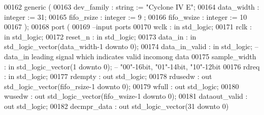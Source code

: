 \begin{DoxyCode}
00162   \textcolor{keywordflow}{generic} (
00163             dev_family      : \textcolor{comment}{string}  := \textcolor{keyword}{"Cyclone IV E"};
00164             data_width      : \textcolor{comment}{integer} := \textcolor{vhdllogic}{}\textcolor{vhdllogic}{31};
00165             fifo_rsize      : \textcolor{comment}{integer} := \textcolor{vhdllogic}{}\textcolor{vhdllogic}{9} ;
00166             fifo_wsize      : \textcolor{comment}{integer} := \textcolor{vhdllogic}{}\textcolor{vhdllogic}{10}
00167             );
00168   \textcolor{keywordflow}{port} (
00169 \textcolor{keyword}{        --input ports }
00170             wclk          : \textcolor{keywordflow}{in} \textcolor{comment}{std\_logic};
00171             rclk          : \textcolor{keywordflow}{in} \textcolor{comment}{std\_logic};
00172             reset_n       : \textcolor{keywordflow}{in} \textcolor{comment}{std\_logic};
00173             data_in       : \textcolor{keywordflow}{in} \textcolor{comment}{std\_logic\_vector}(data_width\textcolor{vhdlchar}{-}\textcolor{vhdllogic}{}\textcolor{vhdllogic}{1} \textcolor{keywordflow}{downto} \textcolor{vhdllogic}{}\textcolor{vhdllogic}{0});
00174             data_in_valid : \textcolor{keywordflow}{in} \textcolor{comment}{std\_logic}; \textcolor{keyword}{-- data\_in leading signal which indicates valid incomong data}
00175             sample_width  : \textcolor{keywordflow}{in} \textcolor{comment}{std\_logic\_vector}(\textcolor{vhdllogic}{}\textcolor{vhdllogic}{1} \textcolor{keywordflow}{downto} \textcolor{vhdllogic}{}\textcolor{vhdllogic}{0}); \textcolor{keyword}{-- "00"-16bit, "01"-14bit, "10"-12bit}
00176             rdreq         : \textcolor{keywordflow}{in} \textcolor{comment}{std\_logic};
00177             rdempty       : \textcolor{keywordflow}{out} \textcolor{comment}{std\_logic};
00178             rdusedw       : \textcolor{keywordflow}{out} \textcolor{comment}{std\_logic\_vector}(fifo_rsize\textcolor{vhdlchar}{-}\textcolor{vhdllogic}{}\textcolor{vhdllogic}{1} \textcolor{keywordflow}{downto} \textcolor{vhdllogic}{}\textcolor{vhdllogic}{0});
00179             wfull         : \textcolor{keywordflow}{out} \textcolor{comment}{std\_logic};
00180             wusedw        : \textcolor{keywordflow}{out} \textcolor{comment}{std\_logic\_vector}(fifo_wsize\textcolor{vhdlchar}{-}\textcolor{vhdllogic}{}\textcolor{vhdllogic}{1} \textcolor{keywordflow}{downto} \textcolor{vhdllogic}{}\textcolor{vhdllogic}{0});
00181             dataout_valid : \textcolor{keywordflow}{out} \textcolor{comment}{std\_logic};
00182             decmpr_data   : \textcolor{keywordflow}{out} \textcolor{comment}{std\_logic\_vector}(\textcolor{vhdllogic}{}\textcolor{vhdllogic}{31} \textcolor{keywordflow}{downto} \textcolor{vhdllogic}{}\textcolor{vhdllogic}{0})    

\end{DoxyCode}
